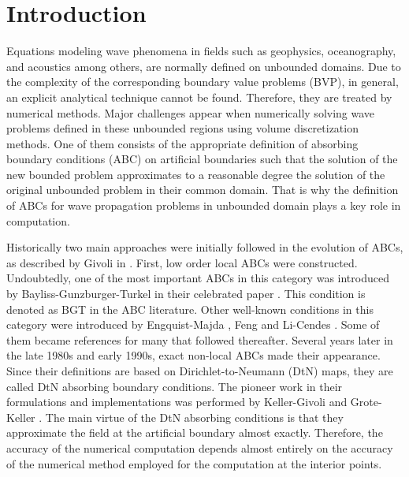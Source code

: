 \documentclass[final,3p,times,12pt]{elsarticle}
\begin{document}
\section{Introduction} \label{Section.Intro}
Equations modeling wave phenomena  in fields such as geophysics, oceanography, and acoustics among others, are normally defined on unbounded domains. Due to the complexity of the corresponding boundary value problems (BVP),  in general, an explicit analytical technique cannot be found. Therefore, they are treated by numerical methods.
 Major challenges appear when numerically solving wave problems defined in these unbounded regions using volume discretization methods. One of them consists of the appropriate definition of absorbing boundary conditions (ABC) on artificial boundaries such that the solution of the new bounded problem approximates to a reasonable degree the solution of the original unbounded problem in their common domain.
That is why the  definition of ABCs for wave propagation problems in unbounded domain plays a key role in computation.

Historically two main approaches were initially followed in the evolution of ABCs, as described by Givoli in \cite{GivoliReview2}.  First, low order local ABCs were constructed. Undoubtedly, one of the most important ABCs in this category was introduced by Bayliss-Gunzburger-Turkel in their celebrated paper \cite{Bayliss01}. This condition is denoted as BGT in the ABC literature. Other well-known conditions in this category were introduced by Engquist-Majda \cite{Engquist01}, Feng \cite{Feng} and Li-Cendes \cite{Li-Cendes}.
Some of them became references for many that followed thereafter. Several years later in the late 1980s and early 1990s, exact non-local ABCs made their appearance. Since their definitions are based on Dirichlet-to-Neumann (DtN) maps, they are called DtN absorbing boundary conditions. The pioneer work in their formulations and implementations was performed by Keller-Givoli \cite{Keller01,Givoli-Keller1990} and Grote-Keller \cite{Grote-Keller01}. The main virtue of the DtN absorbing conditions is that they approximate the field at the artificial boundary almost exactly. Therefore, the accuracy of the numerical computation depends almost entirely on the accuracy of the numerical method employed for the computation at the interior points. 
\end{document}
